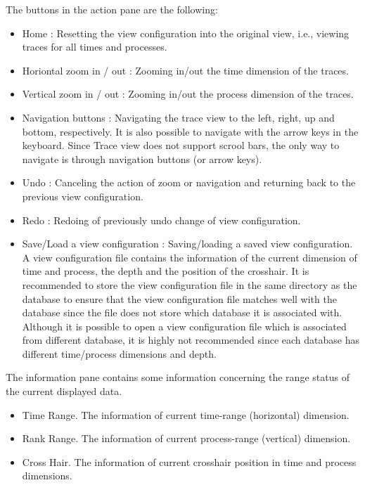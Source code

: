 \documentclass[english]{article}
\begin{document}
The buttons in the action pane are the following:
\begin{itemize}

\item Home : Resetting the view configuration into the original view, i.e., viewing traces for all times and processes.
\item Horiontal zoom in / out : Zooming in/out the time dimension of the traces. 
\item Vertical zoom in / out : Zooming in/out the process dimension of the traces.
\item Navigation buttons : Navigating the trace view to the left, right, up and bottom, respectively. It is also possible to navigate with the arrow keys in the keyboard. Since Trace view does not support scrool bars, the only way to navigate is through navigation buttons (or arrow keys).
\item Undo : Canceling the action of zoom or navigation and returning back to the previous view configuration.
\item Redo : Redoing of previously undo change of view configuration.
\item Save/Load a view configuration : Saving/loading a saved view configuration. 
A view configuration file contains the information of the current dimension of time and process, the depth and the position of the crosshair. 
It is recommended to store the view configuration file in the same directory as the database to ensure that the view configuration file matches well with the database since the file does not store which database it is associated with. 
Although it is possible to open a view configuration file which is associated from different database, it is highly not recommended since each database has different time/process dimensions and depth.


\end{itemize}

The information pane contains some information concerning the range status of the current displayed data.
\begin{itemize}
 \item Time Range. The information of current time-range (horizontal) dimension. 
 \item Rank Range. The information of current process-range (vertical) dimension. 
 \item Cross Hair. The information of current crosshair position in time and process dimensions. 
\end{itemize}
\end{document}
